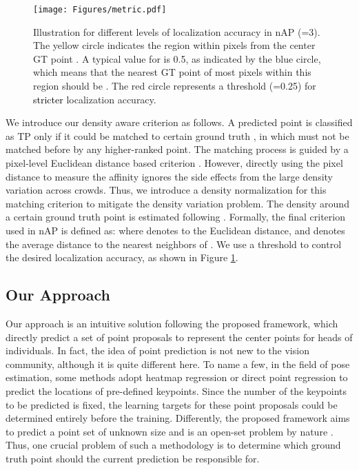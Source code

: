 \documentclass[10pt,twocolumn,letterpaper]{article}
\newcommand{\ywu}[1]{\textcolor{black}{#1}}
\begin{document}
\begin{figure}[t!]
    \centering
    \texttt{[image: Figures/metric.pdf]}
    \caption{Illustration for different levels of localization accuracy in nAP (=3). The yellow circle indicates the region within  pixels from the center GT point . A typical value for  is 0.5, as indicated by the blue circle, which means that the nearest GT point of most pixels within this region should be . The red circle represents a threshold (=0.25) for \ywu{stricter} localization accuracy.}
    \label{fig2}
    \vspace{-1.2em}
\end{figure}
We introduce our density aware criterion as follows. A predicted point  is classified as TP only if it could be matched to certain ground truth , in which  must not be matched before by any higher-ranked point. The matching process is guided by a pixel-level Euclidean distance based criterion . However, directly using the pixel distance to measure the affinity ignores the side effects from the large density variation across crowds. Thus, we introduce a density normalization for this matching criterion to mitigate the density variation problem. The density around a certain ground truth point is estimated following \cite{zhang2016single}. Formally, the final criterion used in nAP is defined as:
 where  denotes to the Euclidean distance, and  denotes the average distance to the  nearest neighbors of . We use a threshold  to control the desired localization accuracy, as shown in Figure \ref{fig2}.
\subsection{Our Approach}\label{label_work}Our approach is an intuitive solution following the proposed framework, which directly predict a set of point proposals to represent the center points for heads of individuals. In fact, the idea of point prediction is not new to the vision community, although it is quite different here. To name a few, in the field of pose estimation, some methods adopt heatmap regression \cite{chen2018cascaded,xiao2018simple} or direct point regression \cite{toshev2014deeppose,xiong2019a2j} to predict the locations of pre-defined keypoints. Since the number of the keypoints to be predicted is fixed, the learning targets for these point proposals could be determined entirely before the training. Differently, the proposed framework aims to predict a point set of unknown size and is an open-set problem by nature \cite{xiong2019open}. Thus, one crucial problem of such a methodology is to determine which ground truth point should the current prediction be responsible for.
\end{document}
